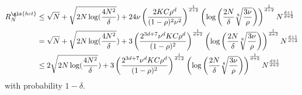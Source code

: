 \begin{align*}
    R_N^{\gls{hct}} & \leq \sqrt{N} + \sqrt{2N\log(\frac{4N^2}{\delta}}) + 24\nu\left(\frac{2KC\rho^d}{(1-\rho)^2\nu^2}\right)^{\frac{1}{d+2}}\left(\log\left(\frac{2N}{\delta}\sqrt[8]{\frac{3\nu}{\rho}}\right)\right)^{\frac{1}{d+2}}N^{\frac{d+1}{d+2}} \\
                              & = \sqrt{N} + \sqrt{2N\log(\frac{4N^2}{\delta}}) + 3\left(\frac{2^{3d+7}\nu^d KC\rho^d}{(1-\rho)^{2}}\right)^{\frac{1}{d+2}}\left(\log\left(\frac{2N}{\delta}\sqrt[8]{\frac{3\nu}{\rho}}\right)\right)^{\frac{1}{d+2}}N^{\frac{d+1}{d+2}} \\
                              & \leq 2\sqrt{2N\log(\frac{4N^2}{\delta}}) + 3\left(\frac{2^{3d+7}\nu^d KC\rho^d}{(1-\rho)^{2}}\right)^{\frac{1}{d+2}}\left(\log\left(\frac{2N}{\delta}\sqrt[8]{\frac{3\nu}{\rho}}\right)\right)^{\frac{1}{d+2}}N^{\frac{d+1}{d+2}}
\end{align*}
with probability $1-\delta$.
